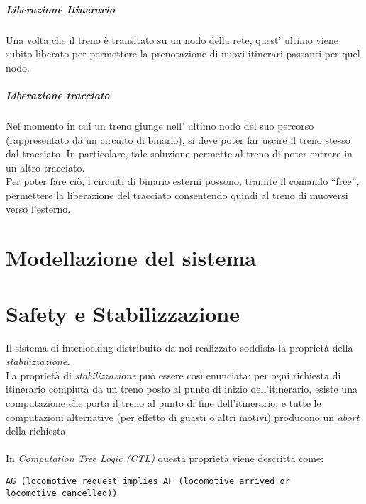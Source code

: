 \documentclass[10pt,a4paper,oneside]{report}
\begin{document}
\paragraph*{Liberazione Itinerario}
Una volta che il treno è transitato su un nodo della rete, quest' ultimo viene subito liberato per permettere la prenotazione di nuovi itinerari passanti per quel nodo.\\
\paragraph*{Liberazione tracciato}
Nel momento in cui un treno giunge nell' ultimo nodo del suo percorso (rappresentato da un circuito di binario), si deve poter far uscire il treno stesso dal tracciato.
In particolare, tale soluzione permette al treno di poter entrare in un altro tracciato.\\
Per poter fare ciò, i circuiti di binario esterni possono, tramite il comando ``free'', permettere la liberazione del tracciato consentendo quindi al treno di muoversi verso l'esterno.



\chapter{Modellazione del sistema}
\label{cap:modelling}

\chapter{Safety e Stabilizzazione}
\label{cap:properties}
Il sistema di interlocking distribuito da noi realizzato soddisfa la proprietà della \emph{stabilizzazione}.\\
La proprietà di \emph{stabilizzazione} può essere così enunciata:
per ogni richiesta di itinerario compiuta da un treno posto al punto di inizio dell’itinerario, esiste una computazione che porta il treno al punto di fine dell’itinerario, e tutte le computazioni alternative (per effetto di guasti o altri motivi) producono un \emph{abort} della richiesta.\\
\\
In \emph{Computation Tree Logic (CTL)} questa proprietà viene descritta come:\\
\begin{lstlisting}
AG (locomotive_request implies AF (locomotive_arrived or locomotive_cancelled))
\end{lstlisting}
\end{document}
